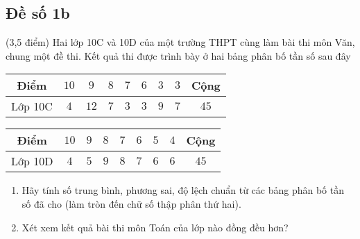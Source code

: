 \subsection{Đề số 1b}
\setcounter{bt}{0}
\begin{bt}%
	(3,5 điểm) Hai lớp 10C và 10D của một trường THPT cùng làm bài thi môn Văn, chung một đề thi. Kết quả thi được trình bày ở hai bảng phân bố tần số sau đây
	\begin{center}
		\begin{tabular}{|c|c|c|c|c|c|c|c|c|}
			\hline 
			Điểm & $10$ & $9$ & $8$ & $7$ & $6$ & $3$ & $3$ & Cộng \\ 
			\hline 
			Lớp 10C & $4$ & $12$ & $7$ & $3$ & $3$ & $9$ & $7$ & $45$ \\ 
			\hline 
		\end{tabular}
	\end{center}
	
	\begin{center}
		\begin{tabular}{|c|c|c|c|c|c|c|c|c|}
			\hline 
			Điểm & $10$ & $9$ & $8$ & $7$ & $6$ & $5$ & $4$ & Cộng \\ 
			\hline 
			Lớp 10D & $4$ & $5$ & $9$ & $8$ & $7$ & $6$ & $6$ & $45$ \\ 
			\hline 
		\end{tabular} 
	\end{center}
	\begin{enumerate}
		\item Hãy tính số trung bình, phương sai, độ lệch chuẩn từ các bảng phân bố tần số đã cho (làm tròn đến chữ số thập phân thứ hai).
		\item Xét xem kết quả bài thi môn Toán của lớp nào đồng đều hơn?
	\end{enumerate}
\end{bt}

